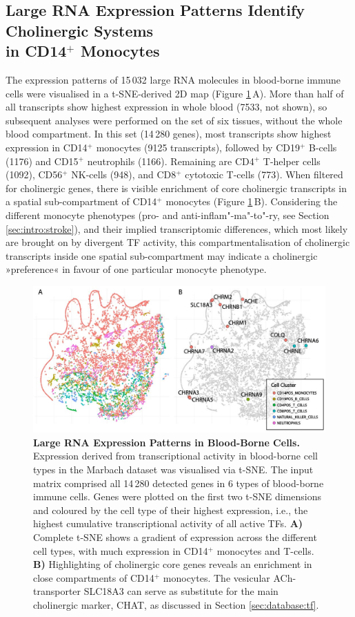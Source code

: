 \subsection{Large RNA Expression Patterns Identify Cholinergic Systems\\ in CD14$^+$ Monocytes}
The expression patterns of 15\,032 large RNA molecules in blood-borne immune cells were visualised in a t-SNE-derived 2D map (Figure \ref{fig:tsne-large}\,A). More than half of all transcripts show highest expression in whole blood (7533, not shown), so subsequent analyses were performed on the set of six tissues, without the whole blood compartment. In this set (14\,280 genes), most transcripts show highest expression in CD14$^+$ monocytes (9125 transcripts), followed by CD19$^+$ B-cells (1176) and CD15$^+$ neutrophils (1166). Remaining are CD4$^+$ T-helper cells (1092), CD56$^+$ NK-cells (948), and CD8$^+$ cytotoxic T-cells (773). When filtered for cholinergic genes, there is visible enrichment of core cholinergic transcripts in a spatial sub-compartment of CD14$^+$ monocytes (Figure \ref{fig:tsne-large}\,B). Considering the different monocyte phenotypes (pro- and anti-inflam"-ma"-to"-ry, see Section \ref{sec:intro:stroke}), and their implied transcriptomic differences, which most likely are brought on by divergent TF activity, this compartmentalisation of cholinergic transcripts inside one spatial sub-compartment may indicate a cholinergic »preference« in favour of one particular monocyte phenotype. 

\begin{figure}[hb]
\includegraphics[width=\textwidth]{figures/tsne-large}
\caption[Large RNA Expression Patterns in Blood-Borne Cells.]{\textbf{Large RNA Expression Patterns in Blood-Borne Cells.} Expression derived from transcriptional activity in blood-borne cell types in the Marbach dataset\cite{Marbach2016} was visualised via t-SNE. The input matrix comprised all 14\,280 detected genes in 6 types of blood-borne immune cells. Genes were plotted on the first two t-SNE dimensions and coloured by the cell type of their highest expression, i.e., the highest cumulative transcriptional activity of all active TFs. \textbf{A)} Complete t-SNE shows a gradient of expression across the different cell types, with much expression in CD14$^+$ monocytes and T-cells. \textbf{B)} Highlighting of cholinergic core genes reveals an enrichment in close compartments of CD14$^+$ monocytes. The vesicular ACh-transporter SLC18A3 can serve as substitute for the main cholinergic marker, CHAT, as discussed in Section \ref{sec:database:tf}.
\label{fig:tsne-large}}
\end{figure}

